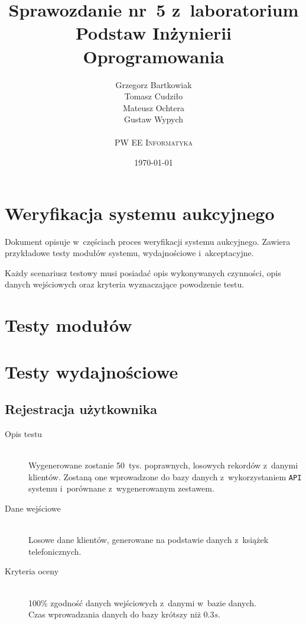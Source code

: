 \documentclass[10pt,a4paper]{article}
\newcommand{\f}[1]{\texttt{#1}}
\begin{document}
\title{
  Sprawozdanie nr~5 z~laboratorium\\Podstaw Inżynierii Oprogramowania
}
\author{
  Grzegorz Bartkowiak\\
  Tomasz Cudziło\\
  Mateusz Ochtera\\
  Gustaw Wypych\\
  \\
  \textsc{PW EE Informatyka}\\[10pt]
}
\date{\today}
\maketitle

\section{Weryfikacja systemu aukcyjnego}

Dokument opisuje w~częściach proces weryfikacji systemu aukcyjnego. Zawiera
przykładowe testy modułów systemu, wydajnościowe i~akceptacyjne.

Każdy scenariusz testowy musi posiadać opis wykonywanych czynności, opis danych
wejściowych oraz kryteria wyznaczające powodzenie testu.

\section{Testy modułów}

\section{Testy wydajnościowe}

\subsection{Rejestracja użytkownika}
\begin{description}
  \item[Opis testu] \hfill \\
    Wygenerowane zostanie 50~tys. poprawnych, losowych rekordów z~danymi
    klientów. Zostaną one wprowadzone do bazy danych z~wykorzystaniem \f{API}
    systemu i~porównane z~wygenerowanym zestawem.
  \item[Dane wejściowe] \hfill \\
    Losowe dane klientów, generowane na podstawie danych z~książek
    telefonicznych.
  \item[Kryteria oceny] \hfill \\
    100\% zgodność danych wejściowych z~danymi w~bazie danych.\\
    Czas wprowadzania danych do bazy krótszy niż $0.3 s$.
\end{description}
\end{document}
